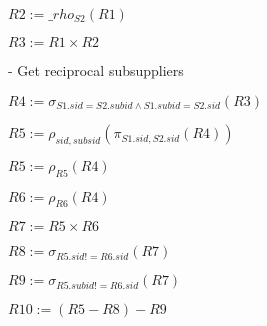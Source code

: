 \documentclass[10pt]{article}
\begin{document}
$R2 := \_rho_{S2}(R1)$

$R3 := R1 \times R2$

- Get reciprocal subsuppliers

$R4 := \sigma_{S1.sid = S2.subid \wedge S1.subid = S2.sid}(R3)$

$R5 := \rho_{sid, subsid}(\pi_{S1.sid, S2.sid}(R4))$

$R5 := \rho_{R5}(R4)$

$R6 := \rho_{R6}(R4)$

$R7 := R5 \times R6$

$R8 := \sigma_{R5.sid != R6.sid}(R7)$

$R9 := \sigma_{R5.subid != R6.sid}(R7)$

$R10 := (R5 - R8) - R9$
\\~\\
\end{document}
